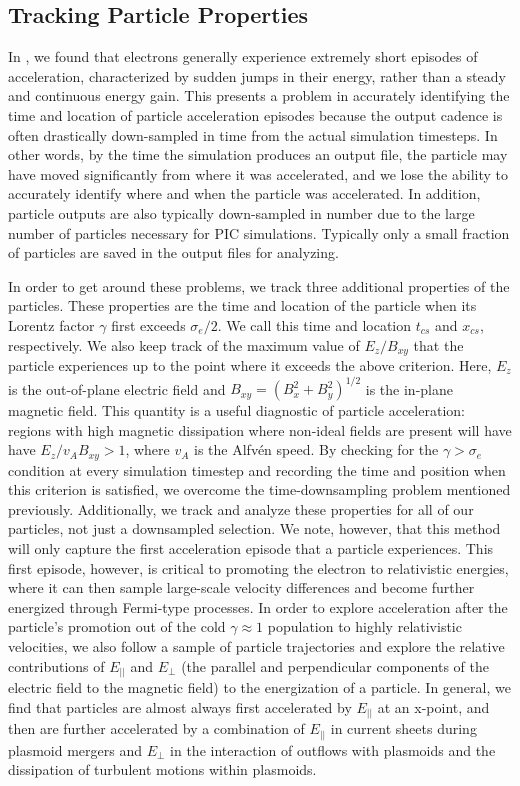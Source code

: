 \documentclass[iop,twocolappendix]{emulateapj}
\begin{document}
\subsection{Tracking Particle Properties} \label{diagnostics}
In \citet{ball2018}, we found that electrons generally experience extremely short episodes of acceleration, characterized by sudden jumps in their energy, rather than a steady and continuous energy gain.  This presents a problem in accurately identifying the time and location of particle acceleration episodes because the output cadence is often drastically down-sampled in time from the actual simulation timesteps.  In other words, by the time the simulation produces an output file, the particle may have moved significantly from where it was accelerated, and we lose the ability to accurately identify where and when the particle was accelerated.  In addition, particle outputs are also typically down-sampled in number due to the large number of particles necessary for PIC simulations.  Typically only a small fraction of particles are saved in the output files for analyzing. 

In order to get around these problems, we track three additional properties of the particles.  These properties are the time and location of the particle when its Lorentz factor $\gamma$ first exceeds $\sigma_{e}/2$.  We call this time and location $t_{cs}$ and $x_{cs}$, respectively.  We also keep track of the maximum value of $E_{z}/B_{xy}$ that the particle experiences up to the point where it exceeds the above criterion.  Here, $E_{z}$ is the out-of-plane electric field and $B_{xy}=(B_{x}^{2}+B_{y}^{2})^{1/2}$ is the in-plane magnetic field.  This quantity is a useful diagnostic of particle acceleration: regions with high magnetic dissipation where non-ideal fields are present will have have $E_{z}/v_{A}B_{xy}>1$, where $v_{A}$ is the Alfv\'en speed.  By checking for the $\gamma > \sigma_{e}$ condition at every simulation timestep and recording the time and position when this criterion is satisfied, we overcome the time-downsampling problem mentioned previously.  Additionally, we track and analyze these properties for all of our particles, not just a downsampled selection.  We note, however, that this method will only capture the first acceleration episode that a particle experiences.  This first episode, however, is critical to promoting the electron to relativistic energies, where it can then sample large-scale velocity differences and become further energized through Fermi-type processes.  In order to explore acceleration after the particle's promotion out of the cold $\gamma\approx1$ population to highly relativistic velocities, we also follow a sample of particle trajectories and explore the relative contributions of $E_{||}$ and $E_{\bot}$ (the parallel and perpendicular components of the electric field to the magnetic field) to the energization of a particle.  In general, we find that particles are almost always first accelerated by $E_{||}$ at an x-point, and then are further accelerated by a combination of $E_{||}$ in current sheets during plasmoid mergers and $E_{\bot}$ in the interaction of outflows with plasmoids and the dissipation of turbulent motions within plasmoids.
\end{document}
